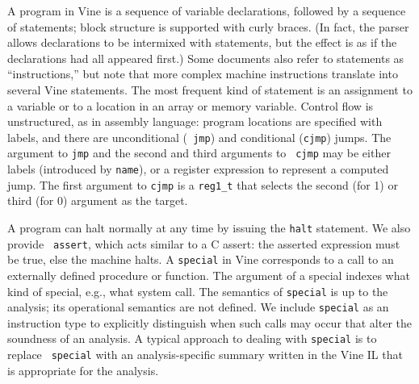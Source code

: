 A program in Vine is a sequence of variable declarations, followed by
a sequence of statements; block structure is supported with curly
braces.
(In fact, the parser allows declarations to be intermixed with
statements, but the effect is as if the declarations had all appeared
first.)
Some documents also refer to statements as ``instructions,'' but note
that more complex machine instructions translate into several Vine
statements.
The most frequent kind of statement is an assignment to a variable or
to a location in an array or memory variable.
Control flow is unstructured, as in assembly language: program
locations are specified with labels, and there are unconditional ({\tt
jmp}) and conditional ({\tt cjmp}) jumps.
The argument to {\tt jmp} and the second and third arguments to {\tt
cjmp} may be either labels (introduced by {\tt name}), or a register
expression to represent a computed jump.
The first argument to {\tt cjmp} is a {\tt reg1\_t} that selects the
second (for 1) or third (for 0) argument as the target.

A program can halt normally
at any time by issuing the {\tt halt} statement.  We also provide {\tt
  assert}, which acts similar to a C assert: the asserted expression
must be true, else the machine halts.
A {\tt special} in Vine corresponds to a call to an externally
defined procedure or function.  The argument of a special indexes what kind
of special, e.g., what system call.  The semantics of {\tt special} is
up to the analysis; its operational semantics are not defined.  We
include {\tt special} as an instruction type to explicitly distinguish
when such calls may occur that alter the soundness of an analysis. A
typical approach to dealing with {\tt special} is to replace {\tt
special} with an analysis-specific summary written in the
Vine IL that is appropriate for the analysis.

